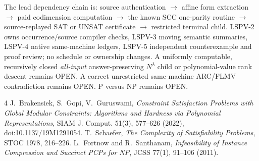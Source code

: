 \documentclass[11pt]{article}
\begin{document}
The lead dependency chain is: source authentication \(\to\) affine form extraction \(\to\) paid codimension computation \(\to\) the known SCC one-parity routine \(\to\) source-replayed SAT or UNSAT certificate \(\to\) restricted terminal child. LSPV-2 owns occurrence/source compiler checks, LSPV-3 moving semantic summaries, LSPV-4 native same-machine ledgers, LSPV-5 independent counterexample and proof review; no schedule or ownership changes. A uniformly computable, recursively closed \emph{all-input} answer-preserving \(N^\lambda\) child or polynomial-value rank descent remains OPEN. A correct unrestricted same-machine ARC/FLMV contradiction remains OPEN. P versus NP remains OPEN.
\begin{thebibliography}{4}
 J.~Brakensiek, S.~Gopi, V.~Guruswami, \emph{Constraint Satisfaction Problems with Global Modular Constraints: Algorithms and Hardness via Polynomial Representations}, SIAM J. Comput. 51(3), 577--626 (2022), doi:10.1137/19M1291054.
 T.~Schaefer, \emph{The Complexity of Satisfiability Problems}, STOC 1978, 216--226.
 L.~Fortnow and R.~Santhanam, \emph{Infeasibility of Instance Compression and Succinct PCPs for NP}, JCSS 77(1), 91--106 (2011).
\end{thebibliography}
\end{document}
